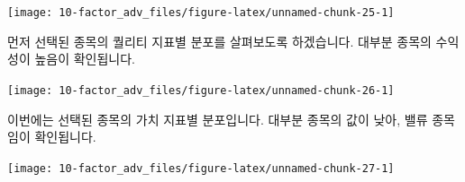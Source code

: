 \documentclass[12pt,]{book}
\newenvironment{Shaded}{\begin{snugshade}}{\end{snugshade}}
\newcommand{\DataTypeTok}[1]{\textcolor[rgb]{0.13,0.29,0.53}{#1}}
\newcommand{\DecValTok}[1]{\textcolor[rgb]{0.00,0.00,0.81}{#1}}
\newcommand{\KeywordTok}[1]{\textcolor[rgb]{0.13,0.29,0.53}{\textbf{#1}}}
\newcommand{\NormalTok}[1]{#1}
\newcommand{\OperatorTok}[1]{\textcolor[rgb]{0.81,0.36,0.00}{\textbf{#1}}}
\newcommand{\OtherTok}[1]{\textcolor[rgb]{0.56,0.35,0.01}{#1}}
\newcommand{\StringTok}[1]{\textcolor[rgb]{0.31,0.60,0.02}{#1}}
\begin{document}
\begin{center}\texttt{[image: 10-factor\_adv\_files/figure-latex/unnamed-chunk-25-1]} \end{center}

먼저 선택된 종목의 퀄리티 지표별 분포를 살펴보도록 하겠습니다. 대부분 종목의 수익성이 높음이 확인됩니다.

\begin{Shaded}
\end{Shaded}

\begin{center}\texttt{[image: 10-factor\_adv\_files/figure-latex/unnamed-chunk-26-1]} \end{center}

이번에는 선택된 종목의 가치 지표별 분포입니다. 대부분 종목의 값이 낮아, 밸류 종목임이 확인됩니다.

\begin{Shaded}
\end{Shaded}

\begin{center}\texttt{[image: 10-factor\_adv\_files/figure-latex/unnamed-chunk-27-1]} \end{center}
\end{document}
